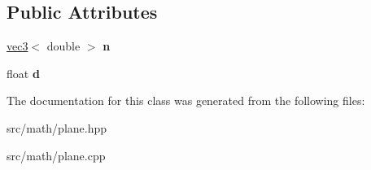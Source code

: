 \subsection*{Public Attributes}
\begin{DoxyCompactItemize}
\item 
\hypertarget{classmath_1_1plane_a129355068d9f4936770d76489205d446}{
\hyperlink{classmath_1_1vec3}{vec3}$<$ double $>$ {\bfseries n}}
\label{classmath_1_1plane_a129355068d9f4936770d76489205d446}

\item 
\hypertarget{classmath_1_1plane_a20a1f2d1caa4d5cb3d81f779bb4572b0}{
float {\bfseries d}}
\label{classmath_1_1plane_a20a1f2d1caa4d5cb3d81f779bb4572b0}

\end{DoxyCompactItemize}


The documentation for this class was generated from the following files:\begin{DoxyCompactItemize}
\item 
src/math/plane.hpp\item 
src/math/plane.cpp\end{DoxyCompactItemize}
